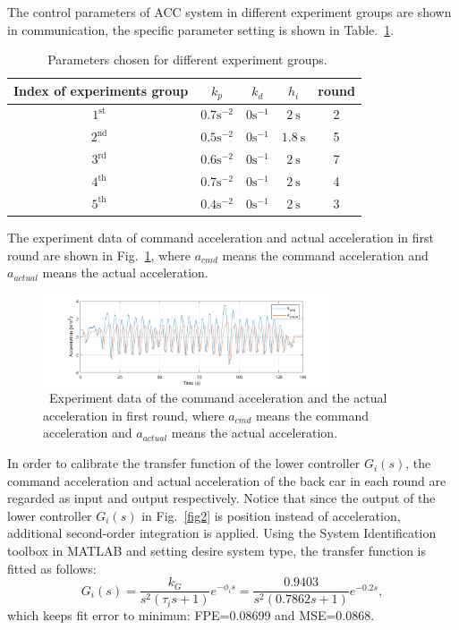\documentclass[journal]{IEEEtran}
\begin{document}
The control parameters of ACC system in different experiment groups are shown in communication, the specific parameter setting is shown in Table.~\ref{table 2}.
\begin{table}
  \caption{~Parameters chosen for different experiment groups.}
  \begin{tabular}{ccccc}
    \hline Index of experiments group & $k_{p}$               & $k_{d}$              & $h_{i}$           & round \\
    \hline $1^{\text {st }}$          & $0.7 \mathrm{s}^{-2}$ & $0  \mathrm{s}^{-1}$ & $2 \mathrm{~s}$   & 2     \\
    \hline $2^{\text {nd }}$          & $0.5 \mathrm{s}^{-2}$ & $0  \mathrm{s}^{-1}$ & $1.8 \mathrm{~s}$ & 5     \\
    \hline $3^{\text {rd }}$          & $0.6 \mathrm{s}^{-2}$ & $0  \mathrm{s}^{-1}$ & $2 \mathrm{~s}$   & 7     \\
    \hline $4^{\text {th }}$          & $0.7 \mathrm{s}^{-2}$ & $0  \mathrm{s}^{-1}$ & $2 \mathrm{~s}$   & 4     \\
    \hline $5^{\text {th }}$          & $0.4 \mathrm{s}^{-2}$ & $0  \mathrm{s}^{-1}$ & $2 \mathrm{~s}$   & 3     \\
    \hline
  \end{tabular}
  \label{table 2}
\end{table}

The experiment data of command acceleration and actual acceleration in first round are shown in Fig.~\ref{fig14}, where $a_{cmd}$ means the command acceleration and $a_{actual}$ means the actual acceleration.

\begin{figure}
  \centering
  \includegraphics[width=8.5cm]{figs/fig14.png}
  \caption{~Experiment data of the command acceleration and the actual acceleration in first round, where $a_{cmd}$ means the command acceleration and $a_{actual}$ means the actual acceleration.}
  \label{fig14}
\end{figure}

In order to calibrate the transfer function of the lower controller $G_i (s)$, the command acceleration and actual acceleration of the back car in each round are regarded as input and output respectively. Notice that since the output of the lower controller $G_i (s)$ in Fig.~\ref{fig2} is position instead of acceleration, additional second-order integration is applied. Using the System Identification toolbox in MATLAB and setting desire system type, the transfer function is fitted as follows:
\begin{equation}
  G_{i}(s)=\frac{k_{G}}{s^{2}\left(\tau_{i} s+1\right)} e^{-\phi_{i} s}=\frac{0.9403}{s^{2}(0.7862 s+1)} e^{-0.2 s},
\end{equation}
which keeps fit error to minimun: FPE=0.08699 and MSE=0.0868.
\end{document}
